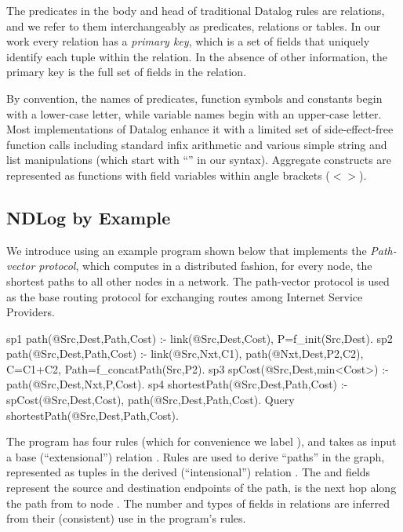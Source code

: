 The predicates in the body and head of traditional Datalog rules are
relations, and we refer to them interchangeably as predicates, relations
or tables.  In our work every relation has a {\em primary key}, which is
a set of fields that uniquely identify each tuple within the
relation. In the absence of other information, the primary key is the
full set of fields in the relation.

By convention, the names of predicates, function symbols and
constants begin with a lower-case letter, while variable names begin
with an upper-case letter.  Most implementations of Datalog enhance it
with a limited set of side-effect-free function calls including standard
infix arithmetic and various simple string and list manipulations
(which start with ``'' in our syntax). Aggregate constructs are 
represented as functions with field variables within angle brackets ($<$$>$).

 



\subsection{NDLog by Example}
\label{sec:language:firstExample}

We introduce \Dlog using an example program shown below that
implements the {\em Path-vector protocol}, which computes in a
distributed fashion, for every
node, the shortest paths to all other nodes in a network. The path-vector protocol is used as the base
routing protocol for exchanging routes among Internet Service
Providers.


\begin{NDlog}
sp1 path(@Src,Dest,Path,Cost) :- link(@Src,Dest,Cost),
    P=f\_init(Src,Dest).
sp2 path(@Src,Dest,Path,Cost) :- link(@Src,Nxt,C1),
    path(@Nxt,Dest,P2,C2), C=C1+C2, Path=f\_concatPath(Src,P2). 
sp3 spCost(@Src,Dest,min<Cost>) :- path(@Src,Dest,Nxt,P,Cost).
sp4 shortestPath(@Src,Dest,Path,Cost) :- spCost(@Src,Dest,Cost), 
    path(@Src,Dest,Path,Cost).
Query shortestPath(@Src,Dest,Path,Cost).
\end{NDlog}


The program has four rules (which for convenience we label
), and takes as input a base (``extensional'') relation
.  Rules  are used to
derive ``paths'' in the graph, represented as tuples in the derived
(``intensional'') relation .  The  and 
fields represent the source and destination endpoints of the path,
 is the next hop along the path  from  to node
. The number and types of fields in relations are inferred from
their (consistent) use in the program's rules.

